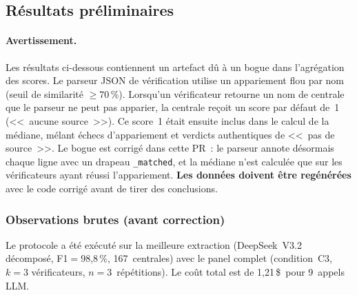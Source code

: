 %
%

\subsection{R\'esultats pr\'eliminaires}\label{sec:multi-verif-results}

\paragraph{Avertissement.} Les r\'esultats ci-dessous contiennent un artefact
d\^u \`a un bogue dans l'agr\'egation des scores. Le parseur JSON de
v\'erification utilise un appariement flou par nom (seuil de similarit\'e
$\geq 70\,\%$). Lorsqu'un v\'erificateur retourne un nom de centrale que
le parseur ne peut pas apparier, la centrale re\c{c}oit un score par
d\'efaut de~1 (<<~aucune source~>>). Ce score~1 \'etait ensuite inclus dans
le calcul de la m\'ediane, m\'elant \'echecs d'appariement et verdicts
authentiques de <<~pas de source~>>. Le bogue est corrig\'e dans cette PR~:
le parseur annote d\'esormais chaque ligne avec un drapeau
\texttt{\_matched}, et la m\'ediane n'est calcul\'ee que sur les
v\'erificateurs ayant r\'eussi l'appariement. \textbf{Les donn\'ees doivent
\^etre reg\'en\'er\'ees} avec le code corrig\'e avant de tirer des conclusions.

\subsubsection{Observations brutes (avant correction)}

Le protocole a \'et\'e ex\'ecut\'e sur la meilleure extraction (DeepSeek~V3.2
d\'ecompos\'e, F1$=$98,8\,\%, 167~centrales) avec le panel complet
(condition~C3, $k=3$ v\'erificateurs, $n=3$~r\'ep\'etitions). Le co\^ut total
est de 1,21\,\$\ pour 9~appels LLM.

